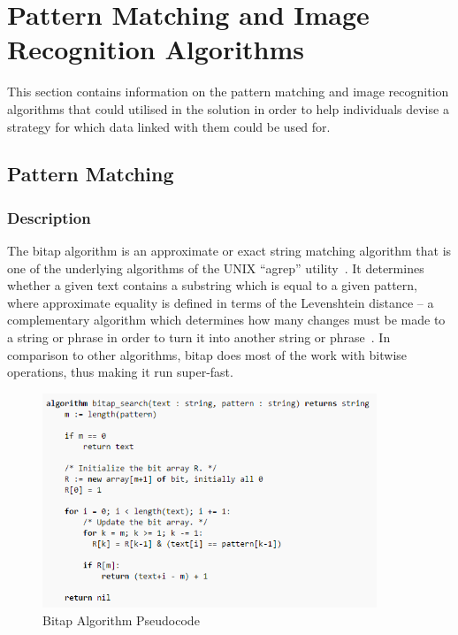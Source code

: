 \section{Pattern Matching and Image Recognition Algorithms}

  This section contains information on the pattern matching and image recognition algorithms that could utilised in the solution in order to help individuals devise a strategy for which data linked with them could be used for.

  \subsection{Pattern Matching}

    \subsubsection{Description}

      The bitap algorithm is an approximate or exact string matching algorithm that is one of the underlying algorithms of the UNIX ``agrep'' utility~\cite{}. It determines whether a given text contains a substring which is equal to a given pattern, where approximate equality is defined in terms of the Levenshtein distance – a complementary algorithm which determines how many changes must be made to a string or phrase in order to turn it into another string or phrase~\cite{}. In comparison to other algorithms, bitap does most of the work with bitwise operations, thus making it run super-fast.

      \begin{figure}
        \centering
        \begin{minipage}{10cm}
          \centering
          \includegraphics[width=10cm]{inc/bitap_algorithm.png}
          \caption{Bitap Algorithm Pseudocode}
          \label{fig:bitap_algorithm_pseudocode}
        \end{minipage}
      \end{figure}


